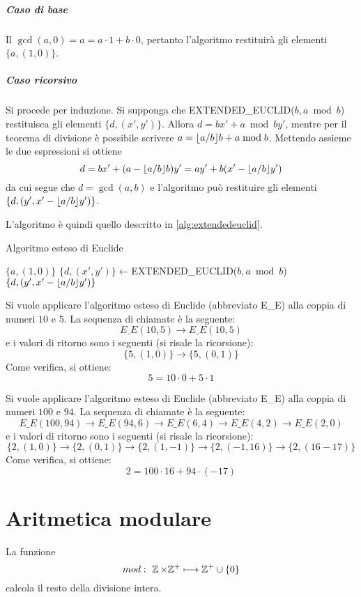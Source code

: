 \subparagraph{Caso di base} Il $\gcd(a,0)=a=a\cdot 1 + b\cdot 0$, pertanto l'algoritmo restituirà gli elementi $\{a, (1,0)\}$.
\subparagraph{Caso ricorsivo} Si procede per induzione. Si supponga che EXTENDED\_EUCLID($b,a\bmod b$) restituisca gli elementi $\{d, (x',y')\}$. Allora $d=bx' + a\bmod by'$, mentre per il teorema di divisione è possibile scrivere $a=\lfloor a/b\rfloor b+a\bmod b$. Mettendo assieme le due espressioni si ottiene
\[
d=bx' + (a-\lfloor a/b\rfloor b)y'=ay'+b(x'-\lfloor a/b\rfloor y')
\]
da cui segue che $d=\gcd(a,b)$ e l'algoritmo può restituire gli elementi $\{d, (y',x'-\lfloor a/b\rfloor y')\}$.


L'algoritmo è quindi quello descritto in \ref{alg:extendedeuclid}.


\begin{algorithm}
\caption{Algoritmo esteso di Euclide}
\label{alg:extendedeuclid}
\begin{algorithmic}
		\State \Return $\{a, (1,0)\}$
	\EndIf
	\State $\{d, (x',y')\} \gets $EXTENDED\_EUCLID($b,a\bmod b$)
	\State \Return $\{d, (y',x'-\lfloor a/b\rfloor y')\}$
\EndFunction
\end{algorithmic}
\end{algorithm}

\begin{esempio}
 Si vuole applicare l'algoritmo esteso di Euclide (abbreviato E\_E) alla coppia di numeri $10$ e $5$. La sequenza di chiamate è la seguente:
 \[
  E\_E(10,5) \longrightarrow E\_E(10,5)
 \]
 e i valori di ritorno sono i seguenti (si risale la ricorsione):
 \[
  \{5, (1,0)\} \longrightarrow \{5, (0,1)\}
 \]
 Come verifica, si ottiene:
 \[
  5 = 10 \cdot 0 + 5 \cdot 1
 \]
\end{esempio}

\begin{esempio}
 Si vuole applicare l'algoritmo esteso di Euclide (abbreviato E\_E) alla coppia di numeri $100$ e $94$. La sequenza di chiamate è la seguente:
 \[
  E\_E(100,94) \longrightarrow E\_E(94,6) \longrightarrow E\_E(6,4) \longrightarrow E\_E(4,2) \longrightarrow E\_E(2,0)
 \]
 e i valori di ritorno sono i seguenti (si risale la ricorsione):
 \[
  \{2, (1,0)\} \longrightarrow \{2, (0,1)\} \longrightarrow \{2, (1,-1)\} \longrightarrow \{2, (-1,16)\} \longrightarrow \{2, (16-17)\}
 \]
 Come verifica, si ottiene:
 \[
  2 = 100 \cdot 16 + 94 \cdot (-17)
 \]
\end{esempio}


\section{Aritmetica modulare}
La funzione 
\[
mod:\ \operatorname*{\mathbb{Z}} \times \mathbb{Z}^{+} \longmapsto \mathbb{Z}^{+}\cup\{0\}
\]
calcola il resto della divisione intera.

